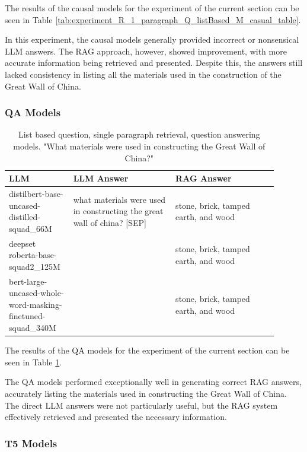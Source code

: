 \documentclass{wseas}
\begin{document}
The results of the causal models for the experiment of the current section can be seen 
in Table \ref{tab:experiment_R_1_paragraph_Q_listBased_M_casual_table}.

In this experiment, the causal models generally provided incorrect or
nonsensical LLM answers. The RAG approach, however, showed improvement,
with more accurate information being retrieved and presented. Despite
this, the answers still lacked consistency in listing all the materials
used in the construction of the Great Wall of China.

\subsubsection{QA Models}

\begin{table}[htbp]
  \centering
  \label{tab:experiment_R_1_paragraph_Q_listBased_M_QaModels_table}  %
  \caption{List based question, single paragraph retrieval, question answering models. "What materials were used in constructing the Great Wall of China?"} %
  \begin{tabular}{|p{0.20\linewidth}|p{0.35\linewidth}|p{0.35\linewidth}|}
    \hline
    \textbf{LLM} & \textbf{LLM Answer} & \textbf{RAG Answer} \\
    \hline
    distilbert-base-uncased-distilled-squad\_66M & what materials were used in constructing the great wall of china? {[}SEP{]} & stone, brick, tamped earth, and wood \\
    \hline
    deepset roberta-base-squad2\_125M & & stone, brick, tamped earth, and wood \\
    \hline
    bert-large-uncased-whole-word-masking-finetuned-squad\_340M & & stone, brick, tamped earth, and wood \\
    \hline
  \end{tabular}
\end{table}

The results of the QA models for the experiment of the current section
can be seen in Table \ref{tab:experiment_R_1_paragraph_Q_listBased_M_QaModels_table}.

The QA models performed exceptionally well in generating correct RAG
answers, accurately listing the materials used in constructing the Great
Wall of China. The direct LLM answers were not particularly useful, but
the RAG system effectively retrieved and presented the necessary
information.

\subsubsection{T5 Models}
\end{document}
